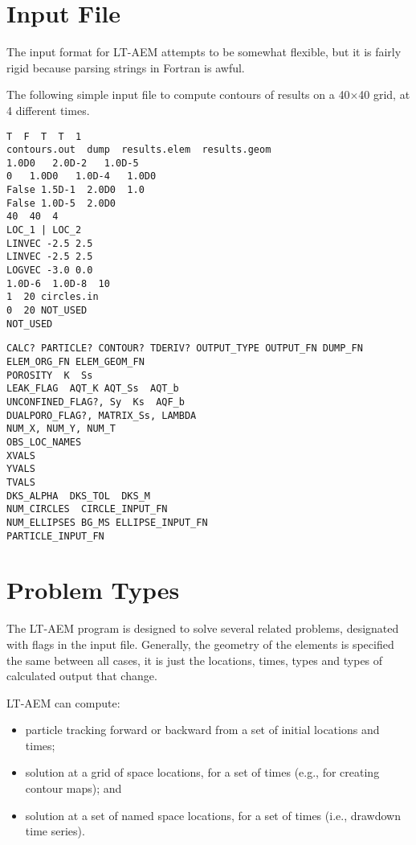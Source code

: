 \documentclass[12pt,letterpaper]{article}
\begin{document}
\section{Input File}
\label{sec:input}
The input format for LT-AEM attempts to be somewhat flexible,  but it is fairly rigid because parsing strings in Fortran is awful.  

The following simple input file to compute contours of results on a 40$\times$40
grid, at 4 different times.

\begin{verbatim}
T  F  T  T  1  
contours.out  dump  results.elem  results.geom  
1.0D0   2.0D-2   1.0D-5   
0   1.0D0   1.0D-4   1.0D0   
False 1.5D-1  2.0D0  1.0  
False 1.0D-5  2.0D0    
40  40  4  
LOC_1 | LOC_2
LINVEC -2.5 2.5 
LINVEC -2.5 2.5 
LOGVEC -3.0 0.0
1.0D-6  1.0D-8  10  
1  20 circles.in   
0  20 NOT_USED  
NOT_USED  
\end{verbatim}

\begin{verbatim}
CALC? PARTICLE? CONTOUR? TDERIV? OUTPUT_TYPE OUTPUT_FN DUMP_FN ELEM_ORG_FN ELEM_GEOM_FN  
POROSITY  K  Ss   
LEAK_FLAG  AQT_K AQT_Ss  AQT_b  
UNCONFINED_FLAG?, Sy  Ks  AQF_b
DUALPORO_FLAG?, MATRIX_Ss, LAMBDA
NUM_X, NUM_Y, NUM_T
OBS_LOC_NAMES
XVALS
YVALS
TVALS
DKS_ALPHA  DKS_TOL  DKS_M  
NUM_CIRCLES  CIRCLE_INPUT_FN   
NUM_ELLIPSES BG_MS ELLIPSE_INPUT_FN
PARTICLE_INPUT_FN
\end{verbatim}

\section{Problem Types}
The LT-AEM program is designed to solve several related problems,
designated with flags in the input file.  Generally, the geometry of
the elements is specified the same between all cases, it is just the
locations, times, types and types of calculated output that change.

LT-AEM can compute:
\begin{itemize}
\item particle tracking forward or backward from a set of initial
  locations and times;
\item solution at a grid of space locations, for a set of times (e.g.,
  for creating contour maps); and
\item solution at a set of named space locations, for a set of times
  (i.e., drawdown time series).
\end{itemize}
\end{document}
